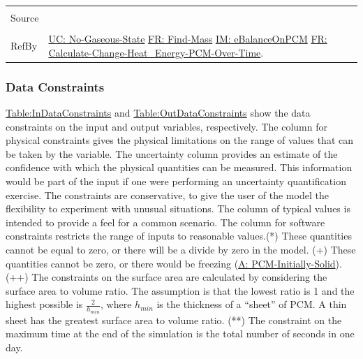 \documentclass[12pt]{article}
\begin{document}
\begin{minipage}{\textwidth}
\begin{tabular}{p{} p{}}
\\ \midrule \\
Source & \cite{koothoor2013}
\\ \midrule \\
RefBy & \hyperref[unlikeChgNGS]{UC: No-Gaseous-State} \hyperref[findMass]{FR: Find-Mass} \hyperref[IM:eBalanceOnPCM]{IM: eBalanceOnPCM} \hyperref[calcChgHeatEnergyPCMOverTime]{FR: Calculate-Change-Heat\_Energy-PCM-Over-Time}.
\\ \bottomrule \end{tabular}
\end{minipage}
\subsubsection{Data Constraints}
\label{Sec:DataConstraints}
\hyperref[Table:InDataConstraints]{Table:InDataConstraints} and \hyperref[Table:OutDataConstraints]{Table:OutDataConstraints} show the data constraints on the input and output variables, respectively. The column for physical constraints gives the physical limitations on the range of values that can be taken by the variable. The uncertainty column provides an estimate of the confidence with which the physical quantities can be measured. This information would be part of the input if one were performing an uncertainty quantification exercise. The constraints are conservative, to give the user of the model the flexibility to experiment with unusual situations. The column of typical values is intended to provide a feel for a common scenario. The column for software constraints restricts the range of inputs to reasonable values.(*) These quantities cannot be equal to zero, or there will be a divide by zero in the model. (+) These quantities cannot be zero, or there would be freezing (\hyperref[assumpPIS]{A: PCM-Initially-Solid}). (++) The constraints on the surface area are calculated by considering the surface area to volume ratio. The assumption is that the lowest ratio is 1 and the highest possible is $\frac{2}{{h_{min}}}$, where ${h_{min}}$ is the thickness of a ``sheet'' of PCM. A thin sheet has the greatest surface area to volume ratio. (**) The constraint on the maximum time at the end of the simulation is the total number of seconds in one day.
\end{document}
